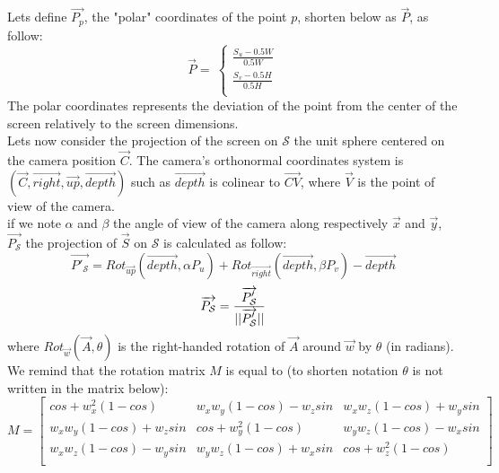 Lets define $\overrightarrow{P_p}$, the "polar" coordinates of the point $p$, shorten below as $\overrightarrow{P}$, as follow:\\
\begin{equation}
\overrightarrow{P}=\
\left\lbrace\begin{array}{l}
\frac{S_u-0.5W}{0.5W}\\
\frac{S_v-0.5H}{0.5H}\\
\end{array}\right.
\end{equation}
The polar coordinates represents the deviation of the point from the center of the screen relatively to the screen dimensions.\\

Lets now consider the projection of the screen on $\mathcal{S}$ the unit sphere centered on the camera position $\overrightarrow{C}$. The camera's orthonormal coordinates system is $(\overrightarrow{C},\overrightarrow{right},\overrightarrow{up},\overrightarrow{depth})$ such as $\overrightarrow{depth}$ is colinear to $\overrightarrow{CV}$, where $\overrightarrow{V}$ is the point of view of the camera.\\

if we note $\alpha$ and $\beta$ the angle of view of the camera along respectively $\overrightarrow{x}$ and $\overrightarrow{y}$, $\overrightarrow{P_{\mathcal{S}}}$ the projection of 
$\overrightarrow{S}$ on $\mathcal{S}$ is calculated as follow:\\
\begin{equation}
\overrightarrow{P'_{\mathcal{S}}}=Rot_{\overrightarrow{up}}(\overrightarrow{depth},\alpha P_u)+Rot_{\overrightarrow{right}}(\overrightarrow{depth},\beta P_v)-\overrightarrow{depth}
\end{equation}
\begin{equation}
\overrightarrow{P_{\mathcal{S}}}=\frac{\overrightarrow{P'_{\mathcal{S}}}}{||\overrightarrow{P'_{\mathcal{S}}}||}\\
\end{equation}
where $Rot_{\overrightarrow{w}}(\overrightarrow{A}, \theta)$ is the right-handed rotation of $\overrightarrow{A}$ around $\overrightarrow{w}$ by $\theta$ (in radians). We remind that the rotation matrix $M$ is equal to (to shorten notation $\theta$ is not written in the matrix below):\\
\begin{equation}
M=\left[
\begin{array}{ccc}
cos+w_x^2(1-cos)&w_xw_y(1-cos)-w_zsin&w_xw_z(1-cos)+w_ysin\\
w_xw_y(1-cos)+w_zsin&cos+w_y^2(1-cos)&w_yw_z(1-cos)-w_xsin\\
w_xw_z(1-cos)-w_ysin&w_yw_z(1-cos)+w_xsin&cos+w_z^2(1-cos)\\
\end{array}
\right]
\end{equation}

